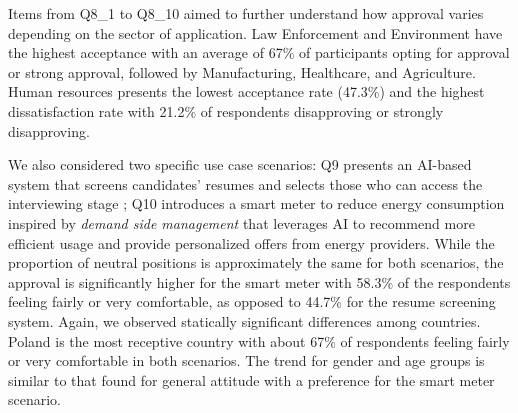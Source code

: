 \documentclass{article}
\begin{document}
Items from Q8\_1 to Q8\_10 aimed to further understand how approval varies depending on the sector of application.
Law Enforcement and Environment have the highest acceptance with an average of 67\% of participants opting for approval or strong approval, followed by Manufacturing, Healthcare, and Agriculture. Human resources presents the lowest acceptance rate (47.3\%) and the highest dissatisfaction rate with 21.2\% of respondents disapproving or strongly disapproving. 

We also considered two specific use case scenarios: Q9 presents an AI-based system that screens candidates' resumes and selects those who can access the interviewing stage \cite{bogen2018help}; Q10 introduces a smart meter to reduce energy consumption inspired by \emph{demand side management} \cite{khan2019smart} that leverages AI to recommend more efficient usage and provide personalized offers from energy providers. 
While the proportion of neutral positions is approximately the same for both scenarios, the approval is significantly higher for the smart meter with 58.3\% of the respondents feeling fairly or very comfortable, as opposed to 44.7\% for the resume screening system. Again, we observed statically significant differences among countries. Poland is the most receptive country with about 67\% of respondents feeling fairly or very comfortable in both scenarios. The trend for gender and age groups is similar to that found for general attitude with a preference for the smart meter scenario.

\end{document}
